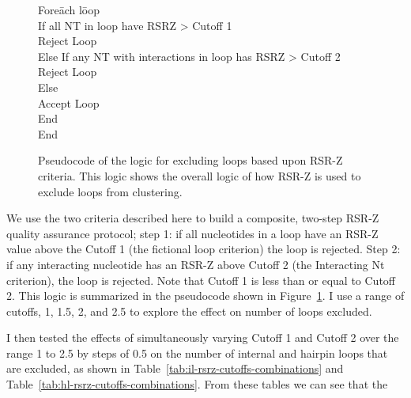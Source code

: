 \begin{figure}
  \begin{tabbing}
  Fore\=ach l\=oop \\
    \>If all NT in loop have RSRZ \textgreater{} Cutoff 1 \\
      \>\>Reject Loop \\
    \>Else If any NT with interactions in loop has RSRZ \textgreater{} Cutoff 2 \\
      \>\>Reject Loop \\
    \>Else \\
      \>\>Accept Loop \\
    \>End \\
  End
  \end{tabbing}
  \caption{Pseudocode of the logic for excluding loops based upon RSR-Z
  criteria. This logic shows the overall logic of how RSR-Z is used to exclude
  loops from clustering.}
  \label{fig:pseudo-rsrz-logic}
\end{figure}

We use the two criteria described here to build a composite, two-step RSR-Z
quality assurance protocol; step 1: if all nucleotides in a loop have an RSR-Z
value above the Cutoff 1 (the fictional loop criterion) the loop is rejected.
Step 2: if any interacting nucleotide has an RSR-Z above Cutoff 2 (the
Interacting Nt criterion), the loop is rejected. Note that Cutoff 1 is less than
or equal to Cutoff 2. This logic is summarized in the pseudocode shown in
Figure~\ref{fig:pseudo-rsrz-logic}. I use a range of cutoffs, 1, 1.5, 2, and 2.5
to explore the effect on number of loops excluded. 

I then tested the effects of simultaneously varying Cutoff 1 and Cutoff 2 over
the range 1 to 2.5 by steps of 0.5 on the number of internal and hairpin loops
that are excluded, as shown in Table~\ref{tab:il-rsrz-cutoffs-combinations} and
Table~\ref{tab:hl-rsrz-cutoffs-combinations}. From these tables we can see that
the

